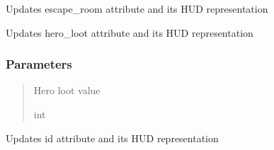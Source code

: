 \documentclass[letterpaper,10pt,english]{sphinxmanual}
\begin{document}
\begin{fulllineitems}
\begin{fulllineitems}
\end{fulllineitems}


\begin{fulllineitems}
\label{\detokenize{api_reference/dungeon_gui/hud:hud.HUD.update_escape_room}}
\pysigstartsignatures
{}
\pysigstopsignatures
\sphinxAtStartPar
Updates escape\_room attribute and its HUD representation

\end{fulllineitems}


\begin{fulllineitems}
\label{\detokenize{api_reference/dungeon_gui/hud:hud.HUD.update_hero_loot}}
\pysigstartsignatures
{}
\pysigstopsignatures
\sphinxAtStartPar
Updates hero\_loot attribute and its HUD representation


\subsubsection{Parameters}
\label{\detokenize{api_reference/dungeon_gui/hud:id4}}\begin{quote}\begin{description}
\sphinxAtStartPar
Hero loot value

\sphinxAtStartPar
int

\end{description}\end{quote}

\end{fulllineitems}


\begin{fulllineitems}
\label{\detokenize{api_reference/dungeon_gui/hud:hud.HUD.update_id}}
\pysigstartsignatures
{}
\pysigstopsignatures
\sphinxAtStartPar
Updates id attribute and its HUD representation



\end{fulllineitems}
\end{fulllineitems}
\end{document}

